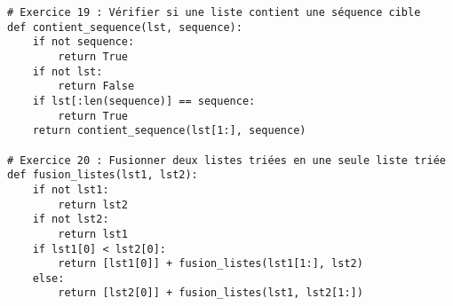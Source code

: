 \begin{lstlisting}
# Exercice 19 : Vérifier si une liste contient une séquence cible
def contient_sequence(lst, sequence):
    if not sequence:
        return True
    if not lst:
        return False
    if lst[:len(sequence)] == sequence:
        return True
    return contient_sequence(lst[1:], sequence)

# Exercice 20 : Fusionner deux listes triées en une seule liste triée
def fusion_listes(lst1, lst2):
    if not lst1:
        return lst2
    if not lst2:
        return lst1
    if lst1[0] < lst2[0]:
        return [lst1[0]] + fusion_listes(lst1[1:], lst2)
    else:
        return [lst2[0]] + fusion_listes(lst1, lst2[1:])
\end{lstlisting}
